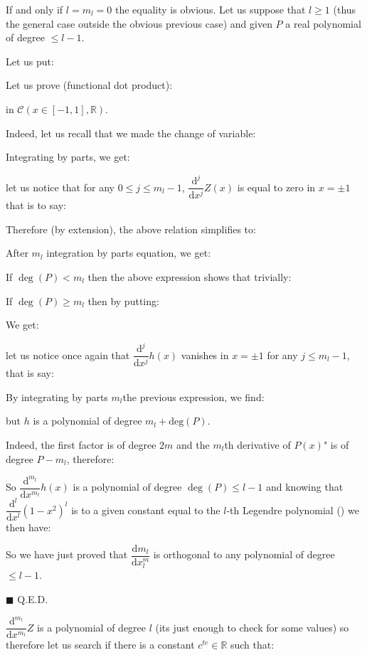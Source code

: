 	\begin{dem}
	If and only if $l=m_l=0$ the equality is obvious. Let us suppose that $l\geq 1$ (thus the general case outside the obvious previous case) and given $P$ a real polynomial of degree $\leq l-1$.

	Let us put:
	
	Let us prove (functional dot product):
	
	in  $\mathcal{C}(x\in[-1,1],\mathbb{R})$.
	
	Indeed, let us recall that we made the change of variable:
	
	Integrating by parts, we get:
	
	let us notice that for any $0\leq j\leq m_l-1$, $\dfrac{\mathrm{d}^j}{\mathrm{d}x^j}Z(x)$ is equal to zero in $x=\pm 1$ that is to say:
	
	Therefore (by extension), the above relation simplifies to:
	
	After $m_l$ integration by parts equation, we get:
	
	If $\deg(P)<m_l$ then the above expression shows that trivially:
	
	If $\deg(P)\geq m_l$ then by putting:
	
	We get:
	
	let us notice once again that $\dfrac{\mathrm{d}^j}{\mathrm{d}x^j}h(x)$ vanishes in $x=\pm 1$ for any $j\leq m_l-1$, that is say:
	
	By integrating by parts $m_l$the previous expression, we find:
	
	but $h$ is a polynomial of degree $m_l+\text{deg}(P)$.
	
	Indeed, the first factor is of degree $2m$ and the $m_l$th derivative of $P(x)$" is of degree $P-m_l$, therefore:
	
	So $\dfrac{\mathrm{d}^{m_l}}{\mathrm{d}x^{m_l}}h(x)$ is a polynomial of degree $\deg(P)\leq l-1$ and knowing that $\dfrac{\mathrm{d}^l}{\mathrm{d}x^l}(1-x^2)^l$ is to a given constant equal to the $l$-th Legendre polynomial () we then have:
	
	So we have just proved that $\dfrac{\mathrm{d}m_l}{\mathrm{d}x^{m}_l}$ is orthogonal to any polynomial of degree $\leq l-1$.
	\begin{flushright}
		$\blacksquare$  Q.E.D.
	\end{flushright}
	\end{dem}
	$\dfrac{\mathrm{d}^{m_l}}{\mathrm{d}x^{m_l}}Z$ is a polynomial of degree $l$ (its just enough to check for some values) so therefore let us search if there is a constant $c^{te}\in\mathbb{R}$ such that:
	
